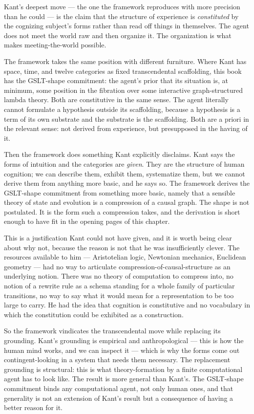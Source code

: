 Kant's deepest move --- the one the framework reproduces with more
precision than he could --- is the claim that the structure of
experience is \emph{constituted} by the cognizing subject's forms
rather than read off things in themselves.
The agent does not meet the world raw and then organize it.
The organization is what makes meeting-the-world possible.

The framework takes the same position with different furniture.
Where Kant has space, time, and twelve categories as fixed
transcendental scaffolding, this book has the GSLT-shape
commitment: the agent's prior that its situation is, at minimum,
some position in the fibration over some interactive
graph-structured lambda theory.
Both are constitutive in the same sense.
The agent literally cannot formulate a hypothesis outside its
scaffolding, because a hypothesis is a term of its own substrate
and the substrate is the scaffolding.
Both are a priori in the relevant sense: not derived from
experience, but presupposed in the having of it.

Then the framework does something Kant explicitly disclaims.
Kant says the forms of intuition and the categories are
\emph{given}.
They are the structure of human cognition; we can describe them,
exhibit them, systematize them, but we cannot derive them from
anything more basic, and he says so.
The framework derives the GSLT-shape commitment from something
more basic, namely that a sensible theory of state and evolution
is a compression of a causal graph.
The shape is not postulated.
It is the form such a compression takes, and the derivation is
short enough to have fit in the opening pages of this chapter.

This is a justification Kant could not have given, and it is worth
being clear about why not, because the reason is not that he was
insufficiently clever.
The resources available to him --- Aristotelian logic, Newtonian
mechanics, Euclidean geometry --- had no way to articulate
compression-of-causal-structure as an underlying notion.
There was no theory of computation to compress into, no notion of a
rewrite rule as a schema standing for a whole family of particular
transitions, no way to say what it would mean for a representation
to be too large to carry.
He had the idea that cognition is constitutive and no vocabulary in
which the constitution could be exhibited as a construction.

So the framework vindicates the transcendental move while replacing
its grounding.
Kant's grounding is empirical and anthropological --- this is how
the human mind works, and we can inspect it --- which is why the
forms come out contingent-looking in a system that needs them
necessary.
The replacement grounding is structural: this is what
theory-formation by a finite computational agent has to look like.
The result is more general than Kant's.
The GSLT-shape commitment binds any computational agent, not only
human ones, and that generality is not an extension of Kant's
result but a consequence of having a better reason for it.

